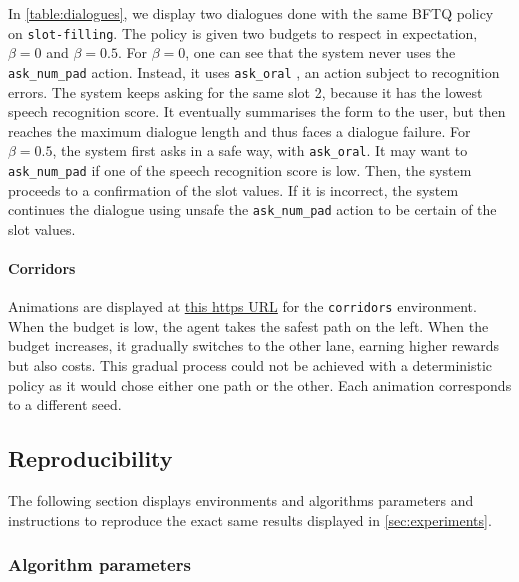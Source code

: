 In \autoref{table:dialogues}, we display two dialogues done with the same BFTQ policy on \texttt{slot-filling}. The policy is given two budgets to respect in expectation, $\beta=0$ and $\beta=0.5$. For $\beta=0$, one can see that the system never uses the \texttt{ask\_num\_pad} action. Instead, it uses \texttt{ask\_oral} , an action subject to recognition errors. The system keeps asking for the same slot 2, because it has the lowest speech recognition score. It eventually summarises the form to the user, but then reaches the maximum dialogue length and thus faces a dialogue failure. For $\beta=0.5$, the system first asks in a safe way, with \texttt{ask\_oral}. It may want to \texttt{ask\_num\_pad} if one of the speech recognition score is low. Then, the system proceeds to a confirmation of the slot values. If it is incorrect, the system continues the dialogue using unsafe the \texttt{ask\_num\_pad} action to be certain of the slot values.



\paragraph{Corridors}

Animations are displayed at  \href{https://budgeted-rl.github.io/\#optimal-budgeted-policies-learnt-with-a-risk-sensitive-exploration}{this https URL} for the \texttt{corridors} environment. When the budget is low, the agent takes the safest path on the left. When the budget increases, it gradually switches to the other lane, earning higher rewards but also costs. This gradual process could not be achieved with a deterministic policy as it would chose either one path or the other. Each animation corresponds to a different seed.

\subsection{Reproducibility}
\label{subsec:reproducibility-supp}

The following section displays environments and algorithms parameters and instructions to reproduce the exact same results displayed in \autoref{sec:experiments}.


\subsubsection{Algorithm parameters}
\label{sec:algorithms-parameters}

